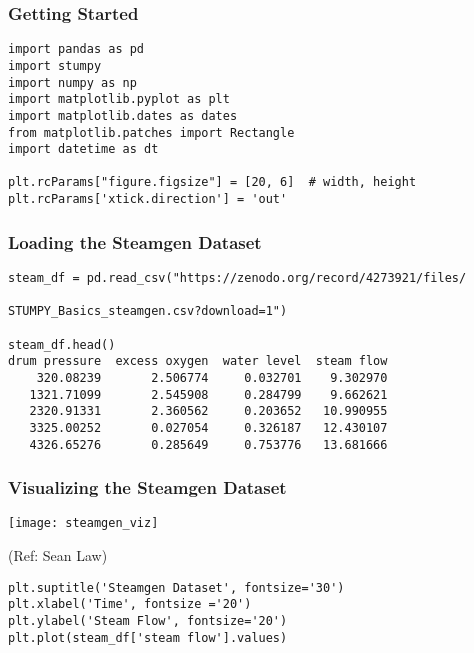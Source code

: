 \begin{frame}[fragile]\frametitle{Getting Started}

\begin{lstlisting}
import pandas as pd
import stumpy
import numpy as np
import matplotlib.pyplot as plt
import matplotlib.dates as dates
from matplotlib.patches import Rectangle
import datetime as dt

plt.rcParams["figure.figsize"] = [20, 6]  # width, height
plt.rcParams['xtick.direction'] = 'out'
\end{lstlisting}

\end{frame}


\begin{frame}[fragile]\frametitle{Loading the Steamgen Dataset}

\begin{lstlisting}
steam_df = pd.read_csv("https://zenodo.org/record/4273921/files/ 

STUMPY_Basics_steamgen.csv?download=1")

steam_df.head()
drum pressure  excess oxygen  water level  steam flow
    320.08239       2.506774     0.032701    9.302970
   1321.71099       2.545908     0.284799    9.662621
   2320.91331       2.360562     0.203652   10.990955 
   3325.00252       0.027054     0.326187   12.430107
   4326.65276       0.285649     0.753776   13.681666
\end{lstlisting}

\end{frame}

\begin{frame}[fragile]\frametitle{Visualizing the Steamgen Dataset}

      \begin{center}
        \texttt{[image: steamgen\_viz]}

		{\tiny (Ref: Sean Law)}		
        \end{center}
		
		
\begin{lstlisting}
plt.suptitle('Steamgen Dataset', fontsize='30')
plt.xlabel('Time', fontsize ='20')
plt.ylabel('Steam Flow', fontsize='20')
plt.plot(steam_df['steam flow'].values)
\end{lstlisting}

\end{frame}

